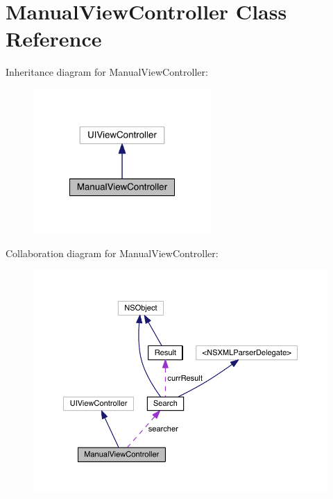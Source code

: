 \section{Manual\+View\+Controller Class Reference}
\label{interface_manual_view_controller}


Inheritance diagram for Manual\+View\+Controller\+:
\nopagebreak
\begin{figure}[H]
\begin{center}
\leavevmode
\includegraphics[width=192pt]{interface_manual_view_controller__inherit__graph}
\end{center}
\end{figure}


Collaboration diagram for Manual\+View\+Controller\+:
\nopagebreak
\begin{figure}[H]
\begin{center}
\leavevmode
\includegraphics[width=350pt]{interface_manual_view_controller__coll__graph}
\end{center}
\end{figure}
